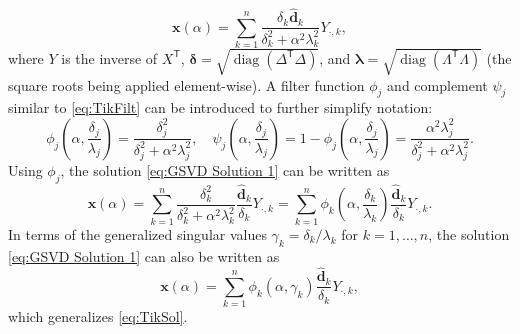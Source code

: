 \documentclass[12pt]{article}
\newcommand{\dVec}{\mathbf{d}}	%
\newcommand{\xVec}{\mathbf{x}}	%
\newcommand{\trans}[1]{{#1}^\mathsf{T}}	%
\newcommand{\pinv}[1]{{#1}^\dagger}	%
\DeclareMathOperator{\diag}{diag}	%
\newcommand{\regparam}{\alpha}  %
\newcommand{\filt}{\phi}
\newcommand{\mfilt}{\psi}
\newcommand{\svd}[1]{\widehat{#1}}	%
\begin{document}
\begin{equation}
\label{eq:GSVD Solution 1}
\xVec(\regparam) = \sum_{k = 1}^{n} \frac{\delta_k \svd{\dVec}_k}{\delta^2_k + \regparam^2 \lambda^2_k}Y_{\cdot,k},
\end{equation}
where $Y$ is the inverse of $\trans{X}$, $\bm{\delta} = \sqrt{\diag(\trans{\Delta}\Delta)}$, and $\bm{\lambda} = \sqrt{\diag(\trans{\Lambda}\Lambda)}$ (the square roots being applied element-wise).  A filter function $\filt_j$ and complement $\mfilt_j$ similar to \eqref{eq:TikFilt} can be introduced to further simplify notation:
\begin{equation}
\label{eq:Filter functions}
\filt_j\left(\regparam,\frac{\delta_j}{\lambda_j}\right) = \frac{\delta^2_j}{\delta^2_j + \regparam^2 \lambda^2_j}, \quad \mfilt_j\left(\regparam,\frac{\delta_j}{\lambda_j}\right) = 1 - \filt_j\left(\regparam,\frac{\delta_j}{\lambda_j}\right) = \frac{\regparam^2 \lambda^2_j}{\delta^2_j + \regparam^2 \lambda^2_j}.
\end{equation}
Using $\filt_j$, the solution \eqref{eq:GSVD Solution 1} can be written as
\begin{equation}
\label{eq:GSVD Solution 2}
\xVec(\regparam) = \sum_{k = 1}^{n} \frac{\delta^2_k}{\delta^2_k + \regparam^2 \lambda^2_k} \frac{\svd{\dVec}_k}{\delta_k} Y_{\cdot,k} = \sum_{k = 1}^{n} \filt_k\left(\regparam,\frac{\delta_k}{\lambda_k}\right) \frac{\svd{\dVec}_k}{\delta_k} Y_{\cdot,k}.
\end{equation} 
In terms of the generalized singular values $\gamma_k = \delta_k/\lambda_k$ for $k = 1,\ldots,n$, the solution \eqref{eq:GSVD Solution 1} can also be written as
\begin{equation}
\label{eq:GSVD Solution 3}
\xVec(\regparam) = \sum_{k = 1}^{n} \filt_k\left(\regparam,\gamma_k\right) \frac{\svd{\dVec}_k}{\delta_k} Y_{\cdot,k},
\end{equation}
which generalizes \eqref{eq:TikSol}. \par
\end{document}
